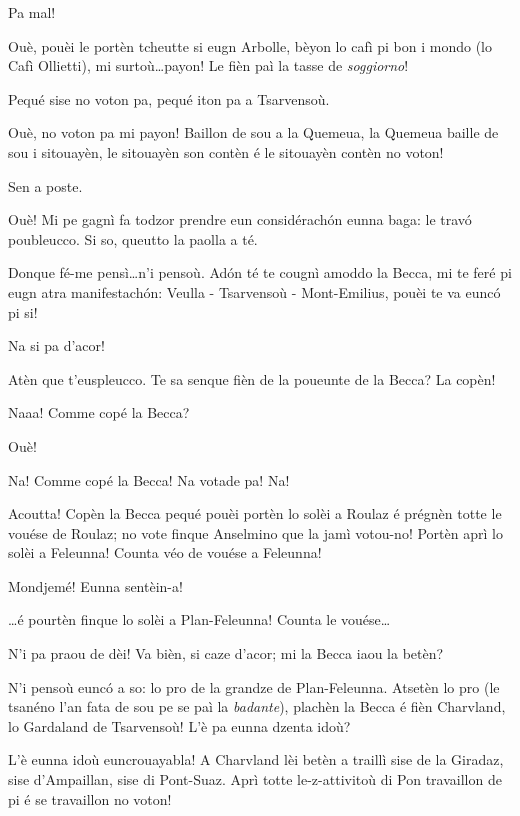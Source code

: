 \begin{drama}
\Ronnyspeaks Pa mal!

\Laurentspeaks Ouè, pouèi le portèn tcheutte si eugn Arbolle, bèyon lo cafì pi bon i mondo (lo Cafì Ollietti), mi surtoù\ldots payon! Le fièn paì la tasse de \textit{soggiorno}!

\Ronnyspeaks Pequé sise no voton pa, pequé iton pa a Tsarvensoù.

\Laurentspeaks Ouè, no voton pa mi payon! Baillon de sou a la Quemeua, la Quemeua baille de sou i sitouayèn, le sitouayèn son contèn é le sitouayèn contèn no voton!

\Ronnyspeaks Sen a poste.

\Laurentspeaks Ouè! Mi pe gagnì fa todzor prendre eun considérach\'on eunna baga: le trav\'o poubleucco. Si so, queutto la paolla a té.

\Ronnyspeaks Donque fé-me pensì\ldots n'i pensoù. Ad\'on té te cougnì amoddo la Becca, mi te feré pi eugn atra manifestach\'on: Veulla - Tsarvensoù - Mont-Emilius, pouèi te va euncó pi si!

\Laurentspeaks Na si pa d'acor!

\Ronnyspeaks Atèn que t'euspleucco. Te sa senque fièn de la poueunte de la Becca?  La copèn!

\Laurentspeaks Naaa! Comme copé la Becca?

\Ronnyspeaks Ouè!

\Laurentspeaks {} Na! Comme copé la Becca! Na votade pa! Na!

\Ronnyspeaks Acoutta! Copèn la Becca pequé pouèi portèn lo solèi a Roulaz é prégnèn totte le vouése de Roulaz; no vote finque Anselmino que la jamì votou-no! Portèn aprì lo solèi a Feleunna! Counta véo de vouése a Feleunna!

\Laurentspeaks Mondjemé! Eunna sentèin-a!

\Ronnyspeaks \ldots é pourtèn finque lo solèi a Plan-Feleunna! Counta le vouése\ldots

\Laurentspeaks N'i pa praou de dèi! Va bièn, si caze d'acor; mi la Becca iaou la betèn?

\Ronnyspeaks N'i pensoù euncó a so: lo pro de la grandze de Plan-Feleunna. Atsetèn lo pro (le tsanéno l'an fata de sou pe se paì la \textit{badante}), plachèn la Becca é fièn Charvland, lo Gardaland de Tsarvensoù! L'è pa eunna dzenta idoù?

\Laurentspeaks L'è eunna idoù euncrouayabla! A Charvland lèi betèn a traillì sise de la Giradaz, sise d'Ampaillan, sise di Pont-Suaz. Aprì totte le-z-attivitoù di Pon travaillon de pi é se travaillon no voton!


\end{drama}
